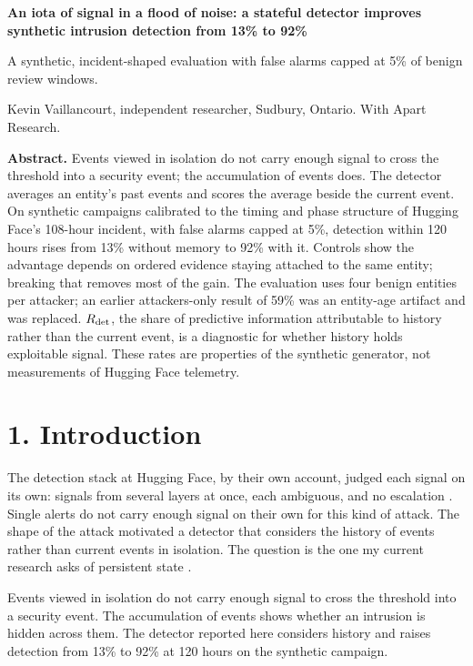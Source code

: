 \documentclass[11pt,letterpaper]{article}
\begin{document}
{\LARGE\bfseries An iota of signal in a flood of noise: a stateful detector \mbox{improves} synthetic intrusion detection from 13\% to 92\%\par}
\vspace{6pt}
A synthetic, incident-shaped evaluation with false alarms capped at 5\% of benign review windows.\par
\vspace{4pt}
Kevin Vaillancourt, independent researcher, Sudbury, Ontario. With Apart Research.\par
\vspace{10pt}

\noindent\textbf{Abstract.} Events viewed in isolation do not carry enough signal to cross the threshold into a security event; the accumulation of events does. The detector averages an entity's past events and scores the average beside the current event. On synthetic campaigns calibrated to the timing and phase structure of Hugging Face's 108-hour incident, with false alarms capped at 5\%, detection within 120 hours rises from 13\% without memory to 92\% with it. Controls show the advantage depends on ordered evidence staying attached to the same entity; breaking that removes most of the gain. The evaluation uses four benign entities per attacker; an earlier attackers-only result of 59\% was an entity-age artifact and was replaced. $R_{\rm det}$, the share of predictive information attributable to history rather than the current event, is a diagnostic for whether history holds exploitable signal. These rates are properties of the synthetic generator, not measurements of Hugging Face telemetry.

\section*{1. Introduction}
The detection stack at Hugging Face, by their own account, judged each signal on its own: signals from several layers at once, each ambiguous, and no escalation \cite{hf_timeline}. Single alerts do not carry enough signal on their own for this kind of attack. The shape of the attack motivated a detector that considers the history of events rather than current events in isolation. The question is the one my current research asks of persistent state \cite{vaillancourt_r}.

Events viewed in isolation do not carry enough signal to cross the threshold into a security event. The accumulation of events shows whether an intrusion is hidden across them. The detector reported here considers history and raises detection from 13\% to 92\% at 120 hours on the synthetic campaign.
\end{document}
